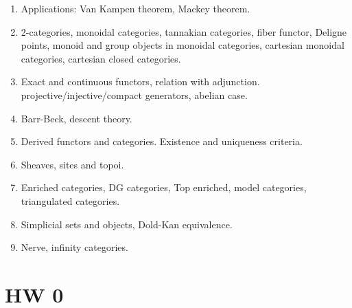 \documentclass[11pt,a4paper]{article}
\begin{document}
\begin{enumerate}
  \item[(7)]
    Applications: Van Kampen theorem, Mackey theorem. 
  \item[(8)]
    2-categories, monoidal categories, tannakian categories, ﬁber functor, Deligne points, monoid and group objects in monoidal categories, cartesian monoidal categories, cartesian closed categories. 
  \item[(9)]
    Exact and continuous functors, relation with adjunction. projective/injective/compact generators, abelian case. 
  \item[(10)]
    Barr-Beck, descent theory. 
  \item[(11)]
    Derived functors and categories. Existence and uniqueness criteria. 
  \item[(12)]
    Sheaves, sites and topoi. 
  \item[(13)]
    Enriched categories, DG categories, Top enriched, model categories, triangulated categories. 
  \item[(14)]
    Simplicial sets and objects, Dold-Kan equivalence. 
  \item[(15)]
    Nerve, inﬁnity categories.
\end{enumerate}

\newpage

\section{HW 0}
\end{document}

